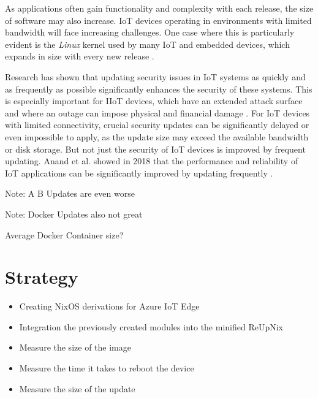 As applications often gain functionality and complexity with each release, the
size of software may also increase. \ac{IoT} devices operating in environments
with limited bandwidth will face increasing challenges. One case where this is
particularly evident is the \textit{Linux} kernel used by many \ac{IoT} and embedded
devices, which expands in size with every new release \cite{linux-kernel-report}.

Research has shown that updating security issues in \ac{IoT} systems as quickly
and as frequently as possible significantly enhances the security of these systems.
This is especially important for \ac{IIoT} devices, which have an extended attack
surface and where an outage can impose physical and financial damage \cite{s20247160}.
For \ac{IoT} devices with limited connectivity, crucial security updates can be
significantly delayed or even impossible to apply, as the update size may exceed
the available bandwidth or disk storage. But not just the security of \ac{IoT}
devices is improved by frequent updating. Anand et al. showed in 2018 that the
performance and reliability of \ac{IoT} applications can be significantly improved
by updating frequently \cite{Anand2018}.

\bigskip\noindent Note: A B Updates are even worse

\bigskip\noindent Note: Docker Updates also not great

\bigskip\noindent Average Docker Container size?


\section{Strategy}
\begin{tcolorbox}[title=TODO]
    \begin{itemize}
    \item Creating NixOS derivations for Azure IoT Edge
    \item Integration the previously created modules into the minified ReUpNix
    \item Measure the size of the image
    \item Measure the time it takes to reboot the device
    \item Measure the size of the update
    \end{itemize}
\end{tcolorbox}

